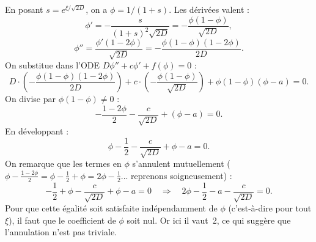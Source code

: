 \documentclass[11pt,a4paper]{report}
\begin{document}
En posant $s = e^{\xi/\sqrt{2D}}$, on a $\phi = 1/(1+s)$. Les d\'eriv\'ees valent :
\begin{equation}
  \phi' = -\frac{s}{(1+s)^2\sqrt{2D}} = -\frac{\phi(1-\phi)}{\sqrt{2D}},
\end{equation}
\begin{equation}
  \phi'' = \frac{\phi'(1-2\phi)}{\sqrt{2D}} = -\frac{\phi(1-\phi)(1-2\phi)}{2D}.
\end{equation}
On substitue dans l'ODE $D\phi''+c\phi'+f(\phi)=0$ :
\begin{equation}
  D\cdot\left(-\frac{\phi(1-\phi)(1-2\phi)}{2D}\right)
  +c\cdot\left(-\frac{\phi(1-\phi)}{\sqrt{2D}}\right)
  +\phi(1-\phi)(\phi-a)=0.
\end{equation}
On divise par $\phi(1-\phi)\neq 0$ :
\begin{equation}
  -\frac{1-2\phi}{2} - \frac{c}{\sqrt{2D}} + (\phi-a) = 0.
\end{equation}
En d\'eveloppant :
\begin{equation}
  \phi - \frac{1}{2} - \frac{c}{\sqrt{2D}} + \phi - a = 0.
\end{equation}
On remarque que les termes en $\phi$ s'annulent mutuellement
($\phi-\frac{1-2\phi}{2}=\phi-\frac12+\phi=2\phi-\frac12$... 
reprenons soigneusement) :
\begin{equation}
  -\frac{1}{2}+\phi-\frac{c}{\sqrt{2D}}+\phi-a=0
  \quad\Longrightarrow\quad
  2\phi - \frac{1}{2} - a - \frac{c}{\sqrt{2D}} = 0.
\end{equation}
Pour que cette \'egalit\'e soit satisfaite ind\'ependamment de $\phi$
(c'est-\`a-dire pour tout $\xi$), il faut que le coefficient de $\phi$ soit nul.
Or ici il vaut~2, ce qui sugg\`ere que l'annulation n'est pas triviale.
\end{document}

